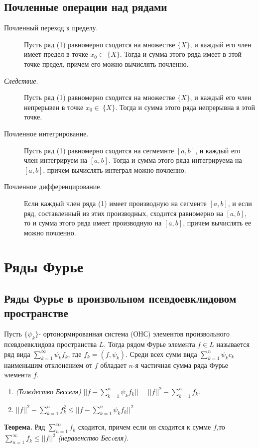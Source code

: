 \documentclass[a4paper,12pt]{scrartcl}
\begin{document}
\subsection{Почленные операции над рядами}
\begin{description}
\item[Почленный переход к пределу.] Пусть ряд (1) равномерно сходится на множестве $\{X\}$, и каждый его член имеет предел в точке $x_0 \in \ \{X\}$. Тогда и сумма этого ряда имеет в этой точке предел, причем его можно вычислять почленно.
\item[\emph{Следствие.}] Пусть ряд (1) равномерно сходится на множестве $\{X\}$, и каждый его член непрерывен в точке $x_0 \in \ \{X\}$. Тогда и сумма этого ряда непрерывна в этой точке.
\item[Почленное интегрирование.] Пусть ряд (1) равномерно сходится на сегмемнте $[a,b]$, и каждый его член интегрируем на $[a,b]$. Тогда и сумма этого ряда интегрируема на $[a,b]$, причем вычислять интеграл можно почленно.
\item[Почленное дифференцирование.] Если каждый член ряда (1) имеет производную на сегменте $[a,b]$, и если ряд, составленный из этих производных, сходится равномерно на $[a,b]$, то и сумма этого ряда имеет производную на $[a,b]$, причем вычислять ее можно почленно.
\end{description}

\section{Ряды Фурье}
\subsection{Ряды Фурье в произвольном псевдоевклидовом пространстве}
Пусть $\{\psi_k\}$- ортонормированная система (ОНС) элементов произвольного псевдоевклидова пространства $L$. Тогда рядом Фурье элемента $f\in L$ называется ряд вида $\sum\limits_{k=1}^{\infty}\psi_kf_k$, где $f_k = (f,\psi_k)$. Среди всех сумм вида $\sum\limits_{k=1}^{n}\psi_kc_k$ наименьшим отклонением от $f$ обладает $n$-я частичная сумма ряда Фурье элемента $f$.
\begin{enumerate}
 \item \textit{(Тождество Бесселя)} $||f - \sum\limits_{k=1}^{n}\psi_kf_k|| = ||f||^2 - \sum\limits_{k=1}^{n}f_k$.
 \item $||f||^2 - \sum\limits_{k=1}^{n}f_k^2 \leqslant || f -\sum\limits_{k=1}^{n}\psi_kf_k ||^2$
\end{enumerate}
 \textbf{Теорема.}  Ряд $\sum\limits_{n=1}^{\infty}f_k$ сходится, причем если он сходится к сумме $f$,то $\sum\limits_{n=1}^{\infty}f_k \leqslant ||f||^2$ \textit{(неравенство Бесcеля)}.
\end{document}
